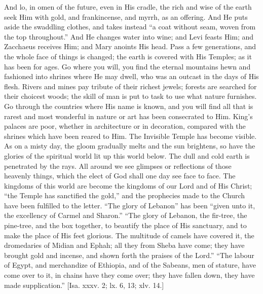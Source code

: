 And lo, in omen of the future, even in His cradle, the rich and
wise of the earth seek Him with gold, and frankincense, and myrrh, as
an offering. And He puts aside the swaddling clothes, and takes
instead ``a coat without seam, woven from the top
throughout.'' And He changes water into wine; and Levi feasts Him;
and Zacchaeus receives Him; and Mary anoints His head. Pass a few
generations, and the whole face of things is changed; the earth is
covered with His Temples; as it has been for ages. Go where you will,
you find the eternal mountains hewn and fashioned into shrines where
He may dwell, who was an outcast in the days of His flesh. Rivers and
mines pay tribute of their richest jewels; forests are searched for
their choicest woods; the skill of man is put to task to use what
nature furnishes. Go through the countries where His name is known,
and you will find all that is rarest and most wonderful in nature or
art has been consecrated to Him. King's palaces are poor, whether in
architecture or in decoration, compared with the shrines which have
been reared to Him. The Invisible Temple has become visible. As on a
misty day, the gloom gradually melts and the sun brightens, so have
the glories of the spiritual world lit up this world below. The dull
and cold earth is penetrated by the rays. All around we see glimpses
or reflections of those heavenly things, which the elect of God shall
one day see face to face. The kingdoms of this world are become the
kingdoms of our Lord and of His Christ; ``the Temple has
sanctified the gold,'' and the prophecies made to the Church have
been fulfilled to the letter. ``The glory of Lebanon'' has
been ``given unto it, the excellency of Carmel and Sharon.''
``The glory of Lebanon, the fir-tree, the pine-tree, and the box
together, to beautify the place of His sanctuary, and to make the
place of His feet glorious. The multitude of camels have covered it,
the dromedaries of Midian and Ephah; all they from Sheba have come;
they have brought gold and incense, and shown forth the praises of the
Lord.'' ``The labour of Egypt, and merchandize of Ethiopia,
and of the Sabeans, men of stature, have come over to it, in chains
have they come over; they have fallen down, they have made
supplication.'' [Isa. xxxv. 2; lx. 6, 13; xlv. 14.]

